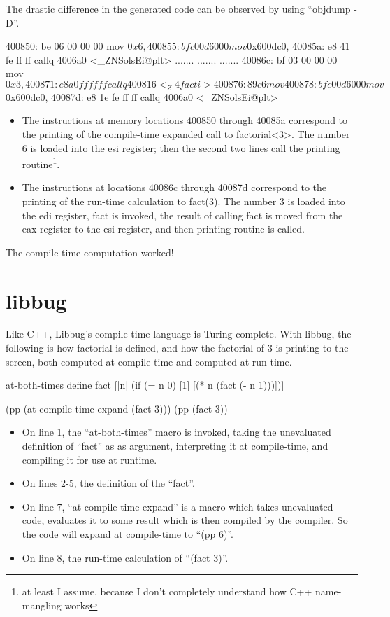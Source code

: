  The drastic difference in the generated code can be observed by using ``objdump -D''.

 \begin{code}
 400850: be 06 00 00 00   mov    $0x6,%
 400855: bf c0 0d 60 00   mov    $0x600dc0,%
 40085a: e8 41 fe ff ff   callq  4006a0 <_ZNSolsEi@plt>
 .......
 .......
 .......
 40086c: bf 03 00 00 00   mov    $0x3,%
 400871: e8 a0 ff ff ff   callq  400816 <_Z4facti>
 400876: 89 c6            mov    %
 400878: bf c0 0d 60 00   mov    $0x600dc0,%
 40087d: e8 1e fe ff ff   callq  4006a0 <_ZNSolsEi@plt>
 \end{code}

 \begin{itemize}
   \item
 The instructions at memory locations 400850 through 40085a correspond to the
 printing of the compile-time expanded call to factorial\textless3\textgreater.
 The number 6 is loaded into the esi register; then the second
 two lines call the printing routine\footnote{at least I assume, because
 I don't completely understand how C++ name-mangling works}.
   \item
 The instructions at locations 40086c through 40087d correspond to the
 printing of the run-time calculation to fact(3).  The number 3
 is loaded into the edi register, fact is invoked, the result of
 calling fact is moved from the eax register to the esi register, and then
 printing routine is called.

 \end{itemize}
 The compile-time computation worked!

 \section{libbug}
 Like C++, Libbug's compile-time language is Turing complete.
 With libbug, the following is how factorial is defined, and how
 the factorial of 3 is printing to the screen, both computed at
 compile-time and computed at run-time.

 \begin{code}
 {at-both-times
  {define fact
    [|n| (if (= n 0)
             [1]
             [(* n (fact (- n 1)))])]}}

 (pp (at-compile-time-expand (fact 3)))
 (pp (fact 3))
 \end{code}

 \begin{itemize}
   \item
      On line 1, the ``at-both-times'' macro is invoked, taking the unevaluated
      definition of ``fact'' as
      as argument, interpreting it at compile-time, and compiling it for use at runtime.
   \item
      On lines 2-5, the definition of the ``fact''.
   \item
      On line 7, ``at-compile-time-expand'' is a macro which takes unevaluated code,
      evaluates it to some result which is then compiled by the compiler.  So the code
      will expand at compile-time to ``(pp 6)''.
   \item
      On line 8, the run-time calculation of ``(fact 3)''.
 \end{itemize}

